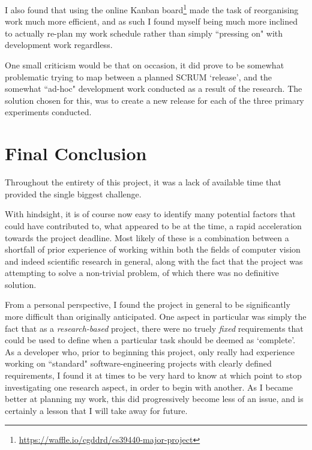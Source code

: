 I also found that using the online Kanban board\footnote{\url{https://waffle.io/cgddrd/cs39440-major-project}} made the task of reorganising work much more efficient, and as such I found myself being much more inclined to actually re-plan my work schedule rather than simply ``pressing on" with development work regardless. 

One small criticism would be that on occasion, it did prove to be somewhat problematic trying to map between a planned SCRUM `release', and the somewhat ``ad-hoc" development work conducted as a result of the research. The solution chosen for this, was to create a new release for each of the three primary experiments conducted.


\section{Final Conclusion}

Throughout the entirety of this project, it was a lack of available time that provided the single biggest challenge.

 With hindsight, it is of course now easy to identify many potential factors that could have contributed to, what appeared to be at the time, a rapid acceleration towards the project deadline. Most likely of these is a combination between a shortfall of prior experience of working within both the fields of computer vision and indeed scientific research in general, along with the fact that the project was attempting to solve a non-trivial problem, of which there was no definitive solution. 
 
 From a personal perspective, I found the project in general to be significantly more difficult than originally anticipated. One aspect in particular was simply the fact that as a \textit{research-based} project, there were no truely \textit{fixed} requirements that could be used to define when a particular task should be deemed as `complete'. As a developer who, prior to beginning this project, only really had experience working on ``standard" software-engineering projects with clearly defined requirements, I found it at times to be very hard to know at which point to stop investigating one research aspect, in order to begin with another. As I became better at planning my work, this did progressively become less of an issue, and is certainly a lesson that I will take away for future. 
 

